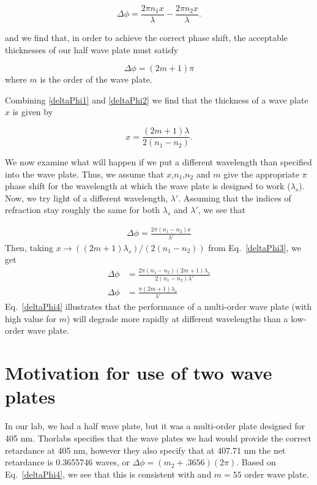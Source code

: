 \begin{equation}
\Delta \phi=\frac{2 \pi n_1 x}{\lambda} -\frac{2 \pi n_2 x}{\lambda}. \label{deltaPhi2}
\end{equation}

and we find that, in order to achieve the correct phase shift, the acceptable thicknesses of our half wave plate must satisfy

\begin{equation}
  \Delta \phi=(2m+1)\pi \label{deltaPhi1}
\end{equation}
where $m$ is the order of the wave plate.

Combining \ref{deltaPhi1} and \ref{deltaPhi2} we find that the thickness of a wave plate $x$ is given by

\begin{equation}
x=\frac{(2m+1) \lambda}{2 (n_1-n_2)}. \label{deltaPhi3}
\end{equation}


We now examine what will happen if we put a different wavelength than specified into the wave plate. Thus, we assume that $x$,$n_1$,$n_2$ and $m$ give the appropriate $\pi$ phase shift for the wavelength at which the wave plate is designed to work ($\lambda_s$). Now, we try light of a different wavelength, $\lambda'$. Assuming that the indices of refraction stay roughly the same for both $\lambda_s$ and $\lambda'$, we see that 

\begin{align}
\Delta \phi=\frac{2 \pi (n_1-n_2) x}{\lambda'} 
\end{align}
Then, taking $x\rightarrow ((2m+1) \lambda_s)/(2 (n_1-n_2))$ from Eq.\ \ref{deltaPhi3}, we get 
\begin{align}
\Delta \phi&=\frac{2 \pi (n_1-n_2) (2m+1) \lambda_s}{2 (n_1-n_2)\lambda'} \\
\Delta \phi&=\frac{\pi (2m+1) \lambda_s}{\lambda'} \label{deltaPhi4}
\end{align}
Eq.\ \ref{deltaPhi4} illustrates that the performance of a multi-order wave plate (with high value for $m$) will degrade more rapidly at different wavelengths than a low-order wave plate. 

\section{Motivation for use of two wave plates}
In our lab, we had a half wave plate, but it was a multi-order plate designed for 405 nm. Thorlabs specifies that the wave plates we had would provide the correct retardance at 405 nm, however they also specify that at 407.71 nm the net retardance is 0.3655746 waves, or $\Delta \phi=(m_2+.3656) (2 \pi)$. Based on Eq.\ \ref{deltaPhi4}, we see that this is consistent with and $m=55$ order wave plate. 

